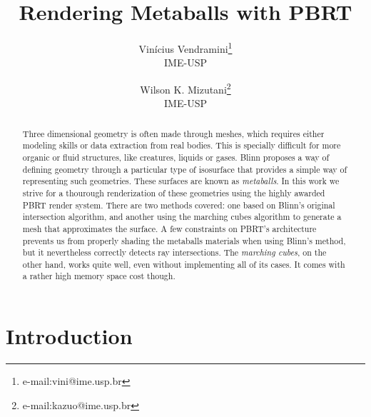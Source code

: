 \documentclass[conference]{acmsiggraph}
\title{Rendering Metaballs with PBRT}
\author{Vinícius Vendramini\thanks{e-mail:vini@ime.usp.br}\\IME-USP \and Wilson K. Mizutani\thanks{e-mail:kazuo@ime.usp.br}\\IME-USP}
\begin{document}

\maketitle

\begin{abstract}

Three dimensional geometry is often made through meshes, which requires
either modeling skills or data extraction from real bodies. This is specially
difficult for more organic or fluid structures, like creatures, liquids or
gases. Blinn  proposes a way of defining
geometry through a particular type of isosurface that provides a simple
way of representing such geometries. These surfaces are known as
\textit{metaballs}. In this work we strive for a thourough renderization of
these geometries using the highly awarded PBRT
\cite{Pharr:2010:PBR:1854996} render system. There are two methods covered:
one based on Blinn's original intersection algorithm, and another using the
marching cubes algorithm \cite{Lorensen:1987:MCH:37402.37422} to generate a mesh
that approximates the surface. A few constraints on PBRT's architecture prevents
us from properly shading the metaballs materials when using Blinn's method, but
it nevertheless correctly detects ray intersections. The \textit{marching
cubes}, on the other hand, works quite well, even without implementing all of
its cases. It comes with a rather high memory space cost though.

\end{abstract}


\keywordlist


\TOGlinkslist


\copyrightspace

\section{Introduction}
\end{document}
